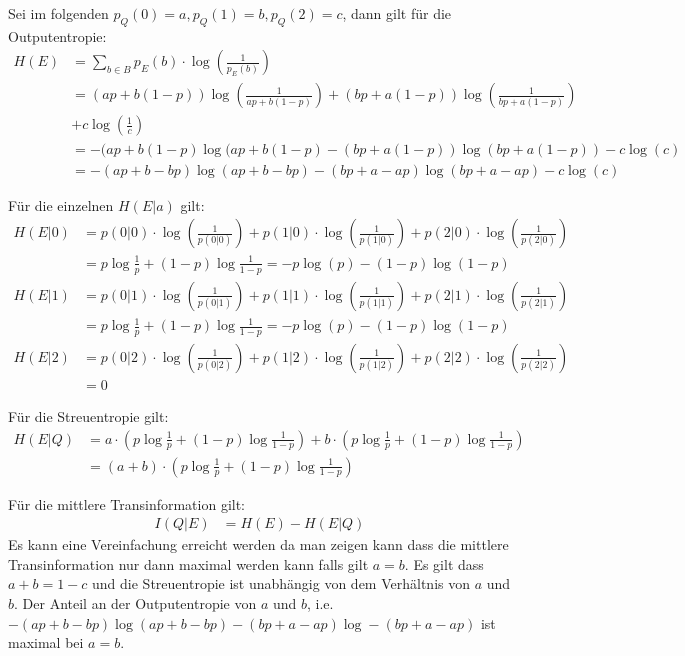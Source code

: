 \begin{myList}
Sei im folgenden $p_Q(0) = a, p_Q(1) = b, p_Q(2) = c$, dann gilt für die Outputentropie:
\begin{align*}
	H(E) &= \sum\limits_{b \in B} p_E(b) \cdot \log \left( \frac{1}{p_E(b)} \right)\\
	&= (ap + b(1-p))\log \left(\frac{1}{ap + b(1-p)}\right) + (bp + a(1-p))\log \left(\frac{1}{bp + a(1-p)}\right)\\
	&+ c \log\left( \frac{1}{c} \right) \\
	&= -(ap + b(1-p)\log(ap + b(1-p) - (bp + a(1-p))\log(bp + a(1-p)) - c\log(c) \\
	&= -(ap + b - bp)\log(ap + b - bp) -(bp + a - ap)\log(bp + a - ap) - c\log(c)
\end{align*}

Für die einzelnen $H(E|a)$ gilt:
\begin{align*}
	H(E|0) &= p(0|0) \cdot \log \left(\frac{1}{p(0|0)} \right) + p(1|0) \cdot \log \left(\frac{1}{p(1|0)} \right) + p(2|0) \cdot \log \left(\frac{1}{p(2|0)} \right)\\
	&= p\log \frac{1}{p} + (1-p) \log \frac{1}{1-p} = -p\log(p) - (1-p)\log(1-p)\\
	H(E|1) &= p(0|1) \cdot \log \left(\frac{1}{p(0|1)} \right) + p(1|1) \cdot \log \left(\frac{1}{p(1|1)} \right) + p(2|1) \cdot \log \left(\frac{1}{p(2|1)} \right)\\
	&= p\log \frac{1}{p} + (1-p) \log \frac{1}{1-p}= -p\log(p) - (1-p)\log(1-p)\\
	H(E|2) &= p(0|2) \cdot \log \left(\frac{1}{p(0|2)} \right) + p(1|2) \cdot \log \left(\frac{1}{p(1|2)} \right) + p(2|2) \cdot \log \left(\frac{1}{p(2|2)} \right) \\
	&= 0
\end{align*}

Für die Streuentropie gilt:
\begin{align*}
	H(E|Q) &= a \cdot (p\log \frac{1}{p} + (1-p) \log \frac{1}{1-p}) + b \cdot (p\log \frac{1}{p} + (1-p) \log \frac{1}{1-p}) \\
	&= (a+b) \cdot (p\log \frac{1}{p} + (1-p) \log \frac{1}{1-p})
\end{align*}

Für die mittlere Transinformation gilt:
\begin{align*}
	I(Q|E) &= H(E) - H(E|Q) 
\end{align*}
Es kann eine Vereinfachung erreicht werden da man zeigen kann dass die mittlere Transinformation nur dann maximal werden kann falls gilt $a = b$.
Es gilt dass $a + b = 1 - c$ und die Streuentropie ist unabhängig von dem Verhältnis von $a$ und $b$.
Der Anteil an der Outputentropie von $a$ und $b$, i.e.  $-(ap + b - bp)\log(ap + b - bp) -(bp + a - ap)\log-(bp + a - ap)$ ist maximal bei $a = b$.


\end{myList}
